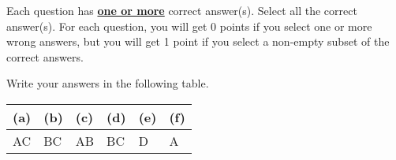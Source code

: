 
Each question has \underline{\textbf{one or more}} correct answer(s). Select all the correct answer(s). For each question, you will get 0 points if you select one or more wrong answers, but you will get 1 point if you select a non-empty subset of the correct answers.

Write your answers in the following table.


\begin{table}[htbp]
	\centering
	\begin{tabular}{|p{1.5cm}|p{1.5cm}|p{1.5cm}|p{1.5cm}|p{1.5cm}|p{1.5cm}|}
		\hline
		(a) & (b) & (c) & (d) & (e) & (f)  \\
		\hline
		  AC  &  BC   &  AB   &   BC  &  D   &  A        \\

		\hline
	\end{tabular}
\end{table}

